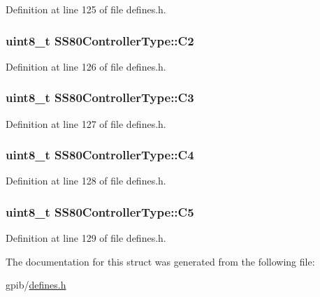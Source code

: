 Definition at line 125 of file defines.\+h.

\subsubsection[{\texorpdfstring{C2}{C2}}]{\setlength{\rightskip}{0pt plus 5cm}uint8\+\_\+t S\+S80\+Controller\+Type\+::\+C2}\hypertarget{structSS80ControllerType_a99a2d4b94a756273b7ad2e4bdc786de8}{}\label{structSS80ControllerType_a99a2d4b94a756273b7ad2e4bdc786de8}


Definition at line 126 of file defines.\+h.

\subsubsection[{\texorpdfstring{C3}{C3}}]{\setlength{\rightskip}{0pt plus 5cm}uint8\+\_\+t S\+S80\+Controller\+Type\+::\+C3}\hypertarget{structSS80ControllerType_acdbaaa95ad03c2a60f9e5cb0f9558ff8}{}\label{structSS80ControllerType_acdbaaa95ad03c2a60f9e5cb0f9558ff8}


Definition at line 127 of file defines.\+h.

\subsubsection[{\texorpdfstring{C4}{C4}}]{\setlength{\rightskip}{0pt plus 5cm}uint8\+\_\+t S\+S80\+Controller\+Type\+::\+C4}\hypertarget{structSS80ControllerType_a1d3d0ce7719f1fcb2d4c8c0c70750cdf}{}\label{structSS80ControllerType_a1d3d0ce7719f1fcb2d4c8c0c70750cdf}


Definition at line 128 of file defines.\+h.

\subsubsection[{\texorpdfstring{C5}{C5}}]{\setlength{\rightskip}{0pt plus 5cm}uint8\+\_\+t S\+S80\+Controller\+Type\+::\+C5}\hypertarget{structSS80ControllerType_ae968d050e8c1a5b20a607dd16b4322c8}{}\label{structSS80ControllerType_ae968d050e8c1a5b20a607dd16b4322c8}


Definition at line 129 of file defines.\+h.



The documentation for this struct was generated from the following file\+:\begin{DoxyCompactItemize}
\item 
gpib/\hyperlink{defines_8h}{defines.\+h}\end{DoxyCompactItemize}
